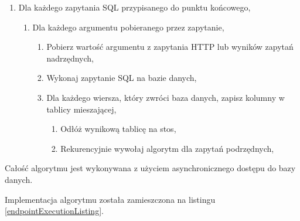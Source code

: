 \begin{enumerate}

    \item Dla każdego zapytania SQL przypisanego do punktu końcowego,

        \begin{enumerate}

            \item Dla każdego argumentu pobieranego przez zapytanie,

                \begin{enumerate}

                    \item Pobierz wartość argumentu z zapytania HTTP lub wyników
                        zapytań nadrzędnych,

                    \item Wykonaj zapytanie SQL na bazie danych,

                    \item Dla każdego wiersza, który zwróci baza danych, zapisz
                        kolumny w tablicy mieszającej,

                        \begin{enumerate}

                            \item Odłóż wynikową tablicę na stos,

                            \item Rekurencyjnie wywołaj algorytm dla zapytań
                                podrzędnych,

                        \end{enumerate}

                \end{enumerate}

        \end{enumerate}

\end{enumerate}

Całość algorytmu jest wykonywana z użyciem asynchronicznego dostępu do bazy
danych.

Implementacja algorytmu została zamieszczona na listingu
\ref{endpointExecutionListing}.


